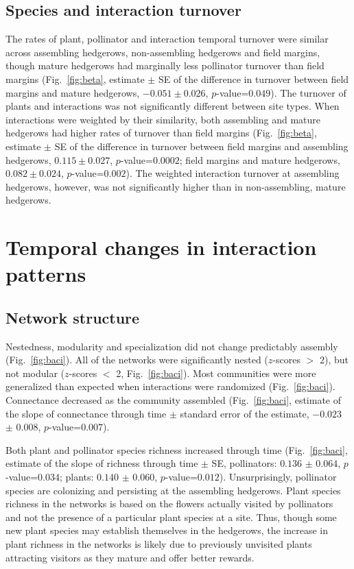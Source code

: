 \documentclass[12pt]{article}
\begin{document}
\subsection*{Species and interaction turnover}
The rates of plant, pollinator and interaction temporal turnover were
similar across assembling hedgerows, non-assembling hedgerows and
field margins, though mature hedgerows had marginally less pollinator
turnover than field margins (Fig.~\ref{fig:beta}, estimate $\pm$ SE of
the difference in turnover between field margins and mature hedgerows,
$-0.051 \pm 0.026$, $p$-value=$0.049$). The turnover of plants and
interactions was not significantly different between site types. When
interactions were weighted by their similarity, both assembling and
mature hedgerows had higher rates of turnover than field margins
(Fig.~\ref{fig:beta}, estimate $\pm$ SE of the difference in turnover
between field margins and assembling hedgerows, $0.115 \pm 0.027$,
$p$-value=$0.0002$; field margins and mature hedgerows, $0.082 \pm
0.024$, $p$-value=$0.002$). The weighted interaction turnover at
assembling hedgerows, however, was not significantly higher than in
non-assembling, mature hedgerows.

\section*{Temporal changes in interaction patterns}
\subsection*{Network structure}

Nestedness, modularity and specialization did not change predictably
assembly (Fig.~\ref{fig:baci}). All of the networks were significantly
nested ($z$-scores $>$ $2$), but not modular ($z$-scores $<$ 2,
Fig.~\ref{fig:baci}). Most communities were more generalized than
expected when interactions were randomized
(Fig.~\ref{fig:baci}). Connectance decreased as the community
assembled (Fig.~\ref{fig:baci}, estimate of the slope of connectance
through time $\pm$ standard error of the estimate, $-0.023$ $\pm$
$0.008$, $p$-value=$0.007$).

Both plant and pollinator species richness increased through time
(Fig.~\ref{fig:baci}, estimate of the slope of richness through time
$\pm$ SE, pollinators: $0.136$ $\pm$ $0.064$, $p$-value=$0.034$;
plants: $0.140$ $\pm$ $0.060$, $p$-value=$0.012$). Unsurprisingly,
pollinator species are colonizing and persisting at the assembling
hedgerows. Plant species richness in the networks is based on the
flowers actually visited by pollinators and not the presence of a
particular plant species at a site. Thus, though some new plant
species may establish themselves in the hedgerows, the increase in
plant richness in the networks is likely due to previously unvisited
plants attracting visitors as they mature and offer better rewards.
\end{document}
